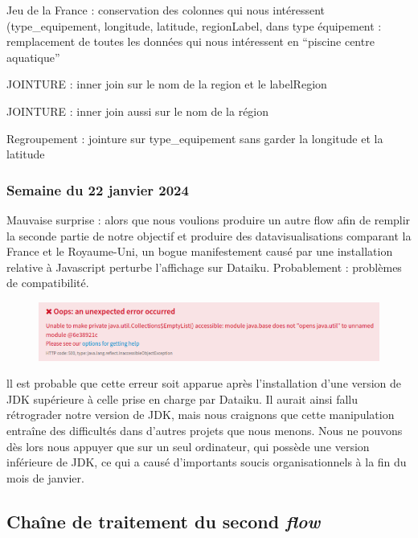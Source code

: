 \documentclass[hidelinks, 12pt]{article}
\begin{document}
Jeu de la France : conservation des colonnes qui nous intéressent (type\_equipement, longitude, latitude, regionLabel, dans type équipement : remplacement de toutes les données qui nous intéressent en \enquote{piscine centre aquatique}

JOINTURE : inner join sur le nom de la region et le labelRegion 

JOINTURE : inner join aussi sur le nom de la région


Regroupement : jointure sur type\_equipement sans garder la longitude et la latitude 











\subsubsection{Semaine du 22 janvier 2024}

Mauvaise surprise : alors que nous voulions produire un autre flow afin de remplir la seconde partie de notre objectif et produire des datavisualisations comparant la France et le Royaume-Uni, un bogue manifestement causé par une installation relative à Javascript perturbe l'affichage sur Dataiku. Probablement : problèmes de compatibilité.

\begin{center}
	\begin{figure}[H]
		\includegraphics[scale=0.5]{images/bogue.png}
	\end{figure}
\end{center}

ll est probable que cette erreur soit apparue après l’installation d’une version de JDK supérieure à celle prise en charge par Dataiku. Il aurait ainsi fallu rétrograder notre version de JDK, mais nous craignons que cette manipulation entraîne des difficultés dans d’autres projets que nous menons. Nous ne pouvons dès lors nous appuyer que sur un seul ordinateur, qui possède une version inférieure de JDK, ce qui a causé d’importants soucis organisationnels à la fin du mois de janvier.

\subsection{Chaîne de traitement du second \emph{flow}}
\end{document}

